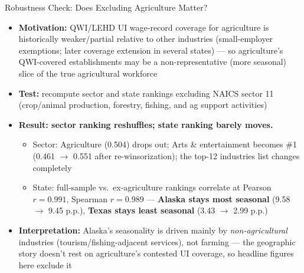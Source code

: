 \documentclass[aspectratio=169]{beamer}
\begin{document}
\begin{frame}{Robustness Check: Does Excluding Agriculture Matter?}
  \small
  \begin{itemize}
    \item \textbf{Motivation:} QWI/LEHD UI wage-record coverage for
          agriculture is historically weaker/partial relative to other
          industries (small-employer exemptions; later coverage extension
          in several states) --- so agriculture's QWI-covered
          establishments may be a non-representative (more seasonal)
          slice of the true agricultural workforce
    \item \textbf{Test:} recompute sector and state rankings excluding
          NAICS sector 11 (crop/animal production, forestry, fishing,
          and ag support activities)
    \item \textbf{Result: sector ranking reshuffles; state ranking barely
          moves.}
    \begin{itemize}
      \item Sector: Agriculture (0.504) drops out; Arts \& entertainment
            becomes \#1 (0.461 $\to$ 0.551 after re-winsorization); the
            top-12 industries list changes completely
      \item State: full-sample vs.\ ex-agriculture rankings correlate at
            Pearson $r=0.991$, Spearman $r=0.989$ ---
            \textbf{Alaska stays most seasonal} (9.58 $\to$ 9.45 p.p.),
            \textbf{Texas stays least seasonal} (3.43 $\to$ 2.99 p.p.)
    \end{itemize}
    \item \textbf{Interpretation:} Alaska's seasonality is driven mainly
          by \emph{non-agricultural} industries (tourism/fishing-adjacent
          services), not farming --- the geographic story doesn't rest on
          agriculture's contested UI coverage, so headline figures here
          exclude it
  \end{itemize}
\end{frame}
\end{document}
